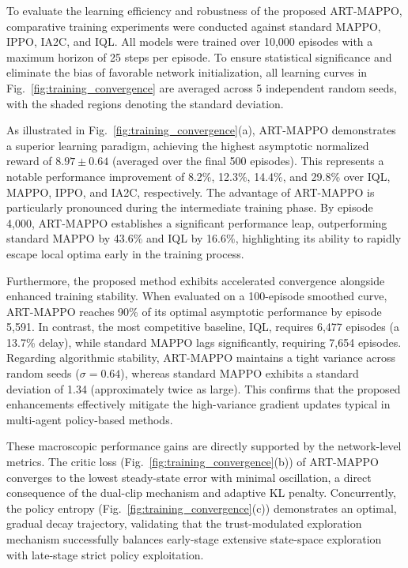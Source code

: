 \documentclass[lettersize,journal]{IEEEtran}
\begin{document}
To evaluate the learning efficiency and robustness of the proposed ART-MAPPO, comparative training experiments were conducted against standard MAPPO, IPPO, IA2C, and IQL. All models were trained over 10,000 episodes with a maximum horizon of 25 steps per episode. To ensure statistical significance and eliminate the bias of favorable network initialization, all learning curves in Fig.~\ref{fig:training_convergence} are averaged across 5 independent random seeds, with the shaded regions denoting the standard deviation.

As illustrated in Fig.~\ref{fig:training_convergence}(a), ART-MAPPO demonstrates a superior learning paradigm, achieving the highest asymptotic normalized reward of $8.97 \pm 0.64$ (averaged over the final 500 episodes). This represents a notable performance improvement of 8.2\%, 12.3\%, 14.4\%, and 29.8\% over IQL, MAPPO, IPPO, and IA2C, respectively. The advantage of ART-MAPPO is particularly pronounced during the intermediate training phase. By episode 4,000, ART-MAPPO establishes a significant performance leap, outperforming standard MAPPO by 43.6\% and IQL by 16.6\%, highlighting its ability to rapidly escape local optima early in the training process.

Furthermore, the proposed method exhibits accelerated convergence alongside enhanced training stability. When evaluated on a 100-episode smoothed curve, ART-MAPPO reaches 90\% of its optimal asymptotic performance by episode 5,591. In contrast, the most competitive baseline, IQL, requires 6,477 episodes (a 13.7\% delay), while standard MAPPO lags significantly, requiring 7,654 episodes. Regarding algorithmic stability, ART-MAPPO maintains a tight variance across random seeds ($\sigma = 0.64$), whereas standard MAPPO exhibits a standard deviation of 1.34 (approximately twice as large). This confirms that the proposed enhancements effectively mitigate the high-variance gradient updates typical in multi-agent policy-based methods.

These macroscopic performance gains are directly supported by the network-level metrics. The critic loss (Fig.~\ref{fig:training_convergence}(b)) of ART-MAPPO converges to the lowest steady-state error with minimal oscillation, a direct consequence of the dual-clip mechanism and adaptive KL penalty. Concurrently, the policy entropy (Fig.~\ref{fig:training_convergence}(c)) demonstrates an optimal, gradual decay trajectory, validating that the trust-modulated exploration mechanism successfully balances early-stage extensive state-space exploration with late-stage strict policy exploitation.
\end{document}
